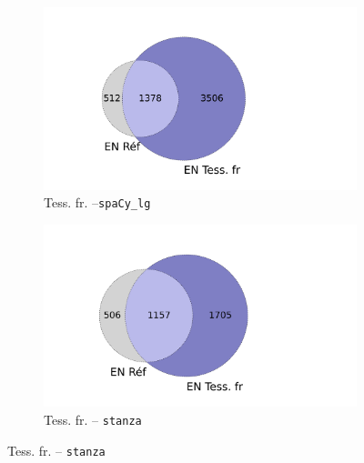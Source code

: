 \begin{figure}[h!]
    \begin{minipage}{7cm}
  \begin{subfigure}{1\textwidth}
  \includegraphics[width=1\textwidth]{IMAGES/INTERSECTIONS_GLOBALES/ELTeCFRA_Tess. fr_spacy-lg-concat_intersection.png} 
  \caption{Tess. fr. --\texttt{spaCy\_lg}}
  \label{fig:ELTeCFRA_Tess. fr_spacy-lg-concat_intersection}
  \end{subfigure}
  \end{minipage}
  \begin{minipage}{7cm}
  \begin{subfigure}{1\textwidth}
  \includegraphics[width=1\textwidth]{IMAGES/INTERSECTIONS_GLOBALES/ELTeCFRA_Tess. fr_stanza-concat_intersection.png}
  \caption{Tess. fr. -- \texttt{stanza}}
  \end{subfigure}
    \end{minipage}

\end{figure}
